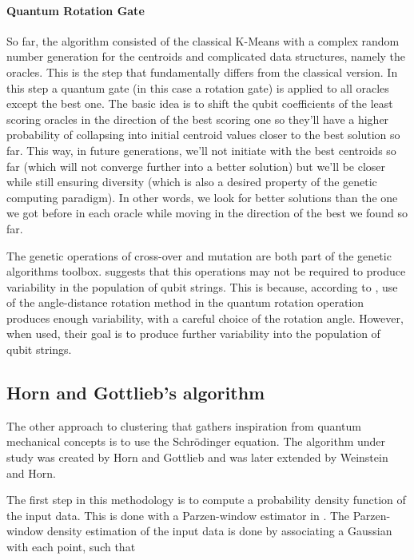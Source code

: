 \paragraph{Quantum Rotation Gate}
So far, the algorithm consisted of the classical K-Means with a complex random number generation for the centroids and complicated data structures, namely the oracles.
This is the step that fundamentally differs from the classical version.
In this step a quantum gate (in this case a rotation gate) is applied to all oracles except the best one.
The basic idea is to shift the qubit coefficients of the least scoring oracles in the direction of the best scoring one so they'll have a higher probability of collapsing into initial centroid values closer to the best solution so far.
This way, in future generations, we'll not initiate with the best centroids so far (which will not converge further into a better solution) but we'll be closer while still ensuring diversity (which is also a desired property of the genetic computing paradigm).
In other words, we look for better solutions than the one we got before in each oracle while moving in the direction of the best we found so far.

The genetic operations of cross-over and mutation are both part of the genetic algorithms toolbox. \cite{Wiebe2014} suggests that this operations may not be required to produce variability in the population of qubit strings.
This is because, according to \cite{Liu2010}, use of the angle-distance rotation method in the quantum rotation operation produces enough variability, with a careful choice of the rotation angle.
However, when used, their goal is to produce further variability into the population of qubit strings.

\subsection{Horn and Gottlieb's algorithm}
\label{sec:horn}

The other approach to clustering that gathers inspiration from quantum mechanical concepts is to use the Schrödinger equation.
The algorithm under study was created by Horn and Gottlieb and was later extended by Weinstein and Horn.

The first step in this methodology is to compute a probability density function of the input data.
This is done with a Parzen-window estimator in \cite{Horn2001a,Weinstein2009}.
The Parzen-window density estimation of the input data is done by associating a Gaussian with each point, such that

